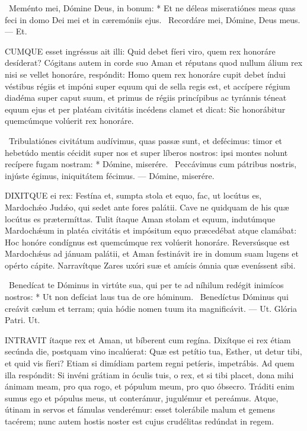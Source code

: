 \R\ Meménto mei, Dómine Deus, in bonum: * Et ne déleas miseratiónes meas quas feci in domo Dei mei et in cæremóniis ejus. \V\ Recordáre mei, Dómine, Deus meus. — Et.


\lettrine[lines=2]{C}{UMQUE} esset ingréssus ait illi: Quid debet fíeri viro, quem rex honoráre desíderat? Cógitans autem in corde suo Aman et réputans quod nullum álium rex nisi se vellet honoráre, respóndit: Homo quem rex honoráre cupit debet índui véstibus régiis et impóni super equum qui de sella regis est, et accípere régium diadéma super caput suum, et primus de régiis princípibus ac tyránnis téneat equum ejus et per platéam civitátis incédens clamet et dicat: Sic honorábitur quemcúmque volúerit rex honoráre.

\R\ Tribulatiónes civitátum audívimus, quas passæ sunt, et defécimus: timor et hebetúdo mentis cécidit super nos et super líberos nostros: ipsi montes nolunt recípere fugam nostram: * Dómine, miserére. \V\ Peccávimus cum pátribus nostris, injúste égimus, iniquitátem fécimus. — Dómine, miserére.



\lettrine[lines=2]{D}{IXITQUE} ei rex: Festína et, sumpta stola et equo, fac, ut locútus es, Mardochǽo Judǽo, qui sedet ante fores palátii. Cave ne quidquam de his quæ locútus es prætermíttas. Tulit ítaque Aman stolam et equum, indutúmque Mardochǽum in platéa civitátis et impósitum equo præcedébat atque clamábat: Hoc honóre condígnus est quemcúmque rex volúerit honoráre. Reversúsque est Mardochǽus ad jánuam palátii, et Aman festinávit ire in domum suam lugens et opérto cápite. Narravítque Zares uxóri suæ et amícis ómnia quæ eveníssent sibi.

\R\ Benedícat te Dóminus in virtúte sua, qui per te ad níhilum redégit inimícos nostros: * Ut non defíciat laus tua de ore hóminum. \V\ Benedíctus Dóminus qui creávit cælum et terram; quia hódie nomen tuum ita magnificávit. — Ut. Glória Patri. Ut.




\lettrine[lines=2]{I}{NTRAVIT} ítaque rex et Aman, ut bíberent cum regína. Dixítque ei rex étiam secúnda die, postquam vino incalúerat: Quæ est petítio tua, Esther, ut detur tibi, et quid vis fíeri? Etiam si dimídiam partem regni petíeris, impetrábis. Ad quem illa respóndit: Si invéni grátiam in óculis tuis, o rex, et si tibi placet, dona mihi ánimam meam, pro qua rogo, et pópulum meum, pro quo óbsecro. Tráditi enim sumus ego et pópulus meus, ut conterámur, jugulémur et pereámus. Atque, útinam in servos et fámulas venderémur: esset tolerábile malum et gemens tacérem; nunc autem hostis noster est cujus crudélitas redúndat in regem.

